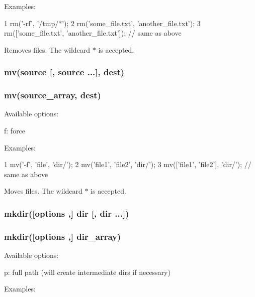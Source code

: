 Examples\+:


\begin{DoxyCode}
1 rm('-rf', '/tmp/*');
2 rm('some\_file.txt', 'another\_file.txt');
3 rm(['some\_file.txt', 'another\_file.txt']); // same as above
\end{DoxyCode}


Removes files. The wildcard {\ttfamily $\ast$} is accepted.

\subsubsection*{mv(source \mbox{[}, source ...\mbox{]}, dest\textquotesingle{})}

\subsubsection*{mv(source\+\_\+array, dest\textquotesingle{})}

Available options\+:


\begin{DoxyItemize}
\item {\ttfamily f}\+: force
\end{DoxyItemize}

Examples\+:


\begin{DoxyCode}
1 mv('-f', 'file', 'dir/');
2 mv('file1', 'file2', 'dir/');
3 mv(['file1', 'file2'], 'dir/'); // same as above
\end{DoxyCode}


Moves files. The wildcard {\ttfamily $\ast$} is accepted.

\subsubsection*{mkdir(\mbox{[}options ,\mbox{]} dir \mbox{[}, dir ...\mbox{]})}

\subsubsection*{mkdir(\mbox{[}options ,\mbox{]} dir\+\_\+array)}

Available options\+:


\begin{DoxyItemize}
\item {\ttfamily p}\+: full path (will create intermediate dirs if necessary)
\end{DoxyItemize}

Examples\+:


